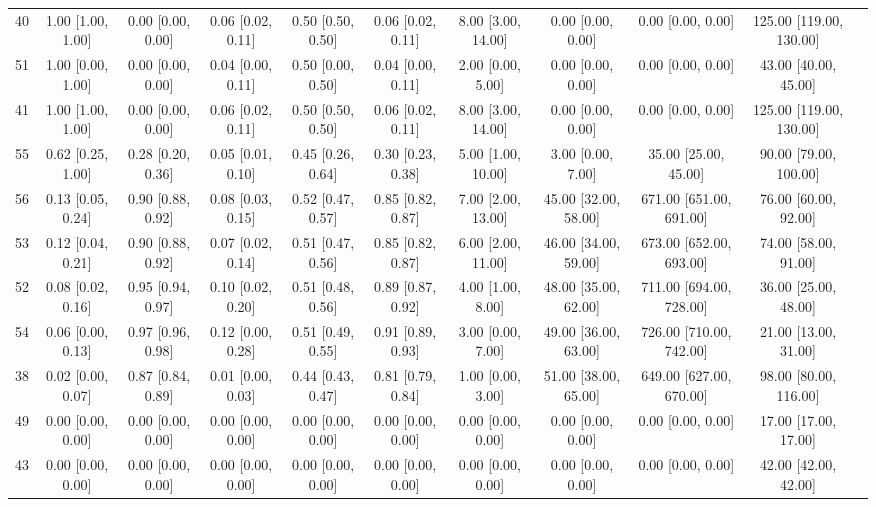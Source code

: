 \documentclass[8pt]{article}
\begin{document}
\begin{center}
\begin{footnotesize}
\begin{longtable}{|ccccccccccc|}
 40 &  1.00 [1.00, 1.00] &  0.00 [0.00, 0.00] &  0.06 [0.02, 0.11] &  0.50 [0.50, 0.50] &  0.06 [0.02, 0.11] &    8.00 [3.00, 14.00] &     0.00 [0.00, 0.00] &        0.00 [0.00, 0.00] &  125.00 [119.00, 130.00] \\
 51 &  1.00 [0.00, 1.00] &  0.00 [0.00, 0.00] &  0.04 [0.00, 0.11] &  0.50 [0.00, 0.50] &  0.04 [0.00, 0.11] &     2.00 [0.00, 5.00] &     0.00 [0.00, 0.00] &        0.00 [0.00, 0.00] &     43.00 [40.00, 45.00] \\
 41 &  1.00 [1.00, 1.00] &  0.00 [0.00, 0.00] &  0.06 [0.02, 0.11] &  0.50 [0.50, 0.50] &  0.06 [0.02, 0.11] &    8.00 [3.00, 14.00] &     0.00 [0.00, 0.00] &        0.00 [0.00, 0.00] &  125.00 [119.00, 130.00] \\
 55 &  0.62 [0.25, 1.00] &  0.28 [0.20, 0.36] &  0.05 [0.01, 0.10] &  0.45 [0.26, 0.64] &  0.30 [0.23, 0.38] &    5.00 [1.00, 10.00] &     3.00 [0.00, 7.00] &     35.00 [25.00, 45.00] &    90.00 [79.00, 100.00] \\
 56 &  0.13 [0.05, 0.24] &  0.90 [0.88, 0.92] &  0.08 [0.03, 0.15] &  0.52 [0.47, 0.57] &  0.85 [0.82, 0.87] &    7.00 [2.00, 13.00] &  45.00 [32.00, 58.00] &  671.00 [651.00, 691.00] &     76.00 [60.00, 92.00] \\
 53 &  0.12 [0.04, 0.21] &  0.90 [0.88, 0.92] &  0.07 [0.02, 0.14] &  0.51 [0.47, 0.56] &  0.85 [0.82, 0.87] &    6.00 [2.00, 11.00] &  46.00 [34.00, 59.00] &  673.00 [652.00, 693.00] &     74.00 [58.00, 91.00] \\
 52 &  0.08 [0.02, 0.16] &  0.95 [0.94, 0.97] &  0.10 [0.02, 0.20] &  0.51 [0.48, 0.56] &  0.89 [0.87, 0.92] &     4.00 [1.00, 8.00] &  48.00 [35.00, 62.00] &  711.00 [694.00, 728.00] &     36.00 [25.00, 48.00] \\
 54 &  0.06 [0.00, 0.13] &  0.97 [0.96, 0.98] &  0.12 [0.00, 0.28] &  0.51 [0.49, 0.55] &  0.91 [0.89, 0.93] &     3.00 [0.00, 7.00] &  49.00 [36.00, 63.00] &  726.00 [710.00, 742.00] &     21.00 [13.00, 31.00] \\
 38 &  0.02 [0.00, 0.07] &  0.87 [0.84, 0.89] &  0.01 [0.00, 0.03] &  0.44 [0.43, 0.47] &  0.81 [0.79, 0.84] &     1.00 [0.00, 3.00] &  51.00 [38.00, 65.00] &  649.00 [627.00, 670.00] &    98.00 [80.00, 116.00] \\
 49 &  0.00 [0.00, 0.00] &  0.00 [0.00, 0.00] &  0.00 [0.00, 0.00] &  0.00 [0.00, 0.00] &  0.00 [0.00, 0.00] &     0.00 [0.00, 0.00] &     0.00 [0.00, 0.00] &        0.00 [0.00, 0.00] &     17.00 [17.00, 17.00] \\
 43 &  0.00 [0.00, 0.00] &  0.00 [0.00, 0.00] &  0.00 [0.00, 0.00] &  0.00 [0.00, 0.00] &  0.00 [0.00, 0.00] &     0.00 [0.00, 0.00] &     0.00 [0.00, 0.00] &        0.00 [0.00, 0.00] &     42.00 [42.00, 42.00] \\

\end{longtable}
\end{footnotesize}
\end{center}
\end{document}
